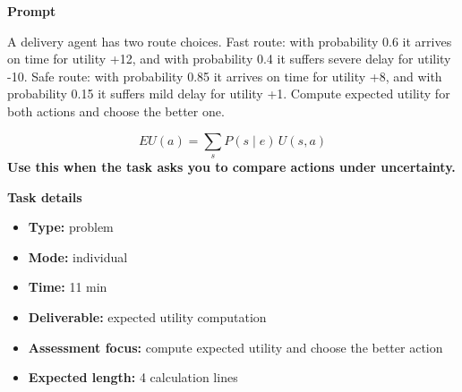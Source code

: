 \documentclass[11pt]{article}
\begin{document}
\begin{tcolorbox}[colback=white,colframe=MidnightBlue,title={Q2 Structured Problem},fonttitle=\bfseries,breakable]
\begin{center}
\end{center}

{\large\bfseries\color{MidnightBlue} Prompt}\par\medskip
A delivery agent has two route choices. Fast route: with probability 0.6 it arrives on time for utility +12, and with probability 0.4 it suffers severe delay for utility -10. Safe route: with probability 0.85 it arrives on time for utility +8, and with probability 0.15 it suffers mild delay for utility +1. Compute expected utility for both actions and choose the better one.

\begin{tcolorbox}[colback=ForestGreen!5,colframe=ForestGreen,title={Formula reminder},fonttitle=\bfseries,breakable]
\[
EU(a)=\sum_{s} P(s \mid e)\,U(s,a)
\]
\textbf{Use this when the task asks you to compare actions under uncertainty.}
\end{tcolorbox}

{\large\bfseries\color{MidnightBlue} Task details}\par\medskip
\begin{itemize}\item \textbf{Type:} problem
\item \textbf{Mode:} individual
\item \textbf{Time:} 11 min
\item \textbf{Deliverable:} expected utility computation
\item \textbf{Assessment focus:} compute expected utility and choose the better action
\item \textbf{Expected length:} 4 calculation lines\end{itemize}


\end{tcolorbox}
\end{document}
